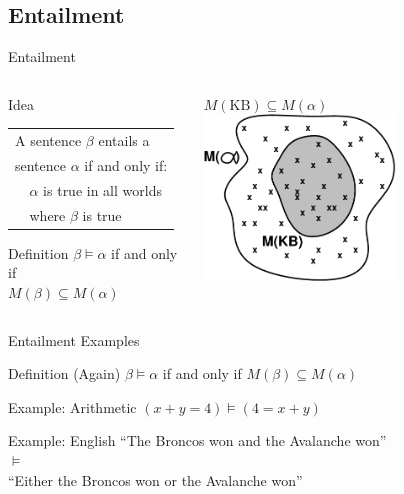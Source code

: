 \documentclass[14pt]{beamer}
\begin{document}
\subsection{Entailment}
\begin{frame}{Entailment}
	\begin{columns}
		\begin{column}{2in}
			\begin{block}{Idea}
				\begin{tabular}{ll}
					\multicolumn{2}{l}{A sentence $\beta$ \alert{entails} a} \\
					\multicolumn{2}{l}{sentence $\alpha$ if and only if:} \\
					& $\alpha$ is true in all worlds \\
					& where $\beta$ is true \\
				\end{tabular}
			\end{block}
			\pause
			\begin{block}{Definition}
				$\beta \models \alpha$ if and only if \\
				\hspace{1em} $M(\beta) \subseteq M(\alpha)$
			\end{block}
		\end{column}
		\pause
		\begin{column}{2in}
			\begin{block}{$M(\mbox{KB}) \subseteq M(\alpha)$}
				\includegraphics[width=2in]{model-inclusion}
			\end{block}
		\end{column}
	\end{columns}
\end{frame}
\begin{frame}{Entailment Examples}
	\begin{block}{Definition (Again)}
		$\beta \models \alpha$ if and only if $M(\beta) \subseteq M(\alpha)$
	\end{block}
	\pause
	\begin{block}{Example: Arithmetic}
		$(x + y = 4) \models (4 = x + y)$
	\end{block}
	\pause
	\begin{block}{Example: English}
		``The Broncos won and the Avalanche won'' \\
		$\models$ \\
		``Either the Broncos won or the Avalanche won''
	\end{block}
\end{frame}
\end{document}
